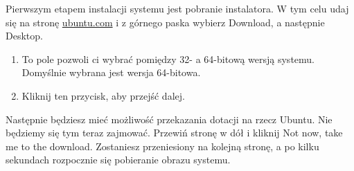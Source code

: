 \begin{center}
\end{center}

Pierwszym etapem instalacji systemu jest pobranie instalatora. W tym celu udaj się na stronę \href{http://www.ubuntu.com/download/desktop}{ubuntu.com} i z górnego paska wybierz \textcolor{ubuntu_orange}{Download}, a następnie \textcolor{ubuntu_orange}{Desktop}.

\begin{enumerate}[label=\protect\circled{\arabic*}]
\item To pole pozwoli ci wybrać pomiędzy 32- a 64-bitową wersją systemu. Domyślnie wybrana jest wersja 64-bitowa.
\item Kliknij ten przycisk, aby przejść dalej.
\end{enumerate}

Następnie będziesz mieć możliwość przekazania dotacji na rzecz Ubuntu. Nie będziemy się tym teraz zajmować. Przewiń stronę w dół i kliknij \textcolor{ubuntu_orange}{Not now, take me to the download}. Zostaniesz przeniesiony na kolejną stronę, a po kilku sekundach rozpocznie się pobieranie obrazu systemu.

